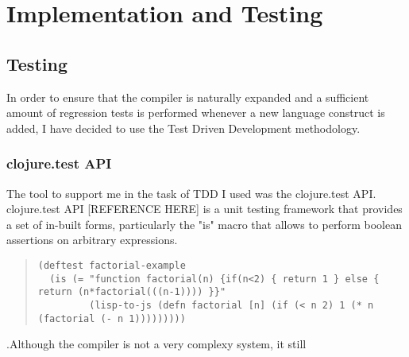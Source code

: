 \chapter{Implementation and Testing}

\section{Testing}
In order to ensure that the compiler is naturally expanded and a sufficient amount of regression tests is performed whenever a new language construct is added, I have decided to use the Test Driven Development methodology. 

\subsection{clojure.test API}
The tool to support me in the task of TDD I used was the clojure.test API.
clojure.test API [REFERENCE HERE] is a unit testing framework that provides a set of in-built forms, particularly the "is" macro that allows to perform boolean assertions on arbitrary expressions. 

\begin{quote}
\begin{verbatim}
(deftest factorial-example
  (is (= "function factorial(n) {if(n<2) { return 1 } else { return (n*factorial(((n-1)))) }}"
         (lisp-to-js (defn factorial [n] (if (< n 2) 1 (* n (factorial (- n 1)))))))))
\end{verbatim}
\end{quote}

.Although the compiler is not a very complexy system, it still 